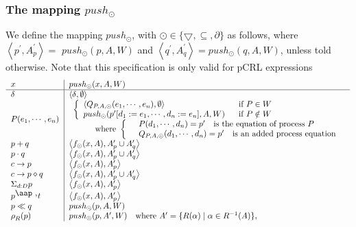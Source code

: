 \documentclass{article}
\begin{document}
\subsubsection{The mapping $push_{\odot }$}

We define the mapping $push_{\odot }$, with $\odot \in \{\bigtriangledown
,\subseteq ,\partial \}$ as follows, where $\left\langle p^{\prime
},A_{p}^{\prime }\right\rangle =$ $push_{\odot }(p,A,W)$ and $\left\langle
q^{\prime },A_{q}^{\prime }\right\rangle =push_{\odot }(q,A,W)$, unless told
otherwise. Note that this specification is only valid for pCRL expressions%
\[
\begin{tabular}{ll}
$x$ & \multicolumn{1}{|l}{$push_{\odot }(x,A,W)$} \\ \hline
$\delta $ & \multicolumn{1}{|l}{$\left\langle \delta ,\emptyset
\right\rangle $} \\ 
$P(e_{1},\cdots ,e_{n})$ & \multicolumn{1}{|l}{$%
\begin{array}{l}
\left\{ 
\begin{array}{ll}
\left\langle Q_{P,A,\odot }(e_{1},\cdots ,e_{n}),\emptyset \right\rangle  & 
\text{if }P\in W \\ 
push_{\odot }(p^{\prime }[d_{1}:=e_{1},\cdots ,d_{n}:=e_{n}],A,W) & \text{if 
}P\notin W%
\end{array}%
\right.  \\ 
\qquad \text{where }\left\{ \text{ }%
\begin{array}{l}
P(d_{1},\cdots ,d_{n})=p^{\prime }\text{ is the equation of process }P \\ 
Q_{P,A,\odot }(d_{1},\cdots ,d_{n})=p^{\prime }\text{ is an added process
equation}%
\end{array}%
\right. 
\end{array}%
$} \\ 
$p+q$ & \multicolumn{1}{|l}{$\left\langle f_{\odot }(x,A),A_{p}^{\prime
}\cup A_{q}^{\prime }\right\rangle $} \\ 
$p\cdot q$ & \multicolumn{1}{|l}{$\left\langle f_{\odot }(x,A),A_{p}^{\prime
}\cup A_{q}^{\prime }\right\rangle $} \\ 
$c\rightarrow p$ & \multicolumn{1}{|l}{$\left\langle f_{\odot
}(x,A),A_{p}^{\prime }\right\rangle $} \\ 
$c\rightarrow p\diamond q$ & \multicolumn{1}{|l}{$\left\langle f_{\odot
}(x,A),A_{p}^{\prime }\cup A_{q}^{\prime }\right\rangle $} \\ 
$\Sigma _{d:D}p$ & \multicolumn{1}{|l}{$\left\langle f_{\odot
}(x,A),A_{p}^{\prime }\right\rangle $} \\ 
$p^{\mathbin{\mbox{\aap ,}}}t$ & \multicolumn{1}{|l}{$\left\langle f_{\odot
}(x,A),A_{p}^{\prime }\right\rangle $} \\ 
$p\ll q$ & \multicolumn{1}{|l}{$push_{\odot }(p,A,W)$} \\ 
$\rho _{R}(p)$ & \multicolumn{1}{|l}{$push_{\odot }(p,A^{\prime },W)\text{
where }A^{\prime }=\{R(\alpha )\mid \alpha \in R^{-1}(A)\},$}%
\end{tabular}%
\]%
\end{document}

